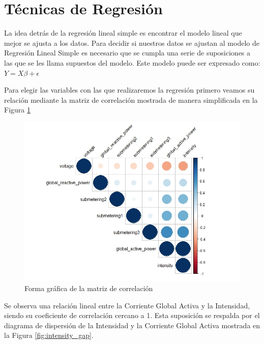 \documentclass[a4paper,10pt,twocolumn]{report}
\begin{document}
\section{Técnicas de Regresión}\label{sub:regression}
	
	La idea detrás de la regresión lineal simple es encontrar el modelo lineal que mejor se ajusta a los datos. Para decidir si nuestros datos se ajustan al modelo de Regresión Lineal Simple es necesario que se cumpla una serie de suposiciones a las que se les llama supuestos del modelo. Este modelo puede ser expresado como: $Y=X\beta + \epsilon$
	
	Para elegir las variables con las que realizaremos la regresión primero veamos su relación mediante la matriz de correlación mostrada de manera simplificada en la Figura \ref{fig:cor_matrix}
	
	
	\begin{figure}[htb]
		\centering
		\includegraphics[width=\linewidth]{img/regression/cor_matrix}
		\caption{Forma gráfica de la matriz de correlación}
		\label{fig:cor_matrix}
	\end{figure}
	
	Se observa una relación lineal entre la Corriente Global Activa y la Intensidad, siendo su coeficiente de correlación cercano a 1. Esta suposición se respalda por el diagrama de dispersión de la Intensidad y la Corriente Global Activa mostrada en la Figura \ref{fig:intensity_gap}.
	
\end{document}
